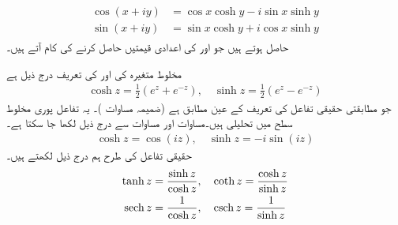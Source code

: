 \begin{gather}
\begin{aligned}\label{مساوات_مخلوط_ہذلولی_تعریف_خ}
\cos(x+iy)&=\cos x\cosh y-i\sin x\sinh y\\
\sin(x+iy)&=\sin x\cosh y+i\cos x\sinh y
\end{aligned}
\end{gather}
حاصل ہوتے ہیں جو  اور  کی اعدادی قیمتیں حاصل کرنے کی کام آتے ہیں۔

مخلوط متغیرہ  کی  اور  کی تعریف درج ذیل ہے
\begin{align}\label{مساوات_مخلوط_ہذلولی_تعریف_ل}
\cosh z=\frac{1}{2}(e^z+e^{-z}),\quad \sinh z=\frac{1}{2}(e^z-e^{-z})
\end{align}
جو مطابقتی حقیقی تفاعل کی تعریف کے عین مطابق ہے (ضمیمہ  مساوات )۔ یہ تفاعل پوری مخلوط سطح میں تحلیلی ہیں۔مساوات  اور مساوات  سے درج ذیل لکھا جا سکتا ہے۔
\begin{align}\label{مساوات_مخلوط_ہذلولی_تعریف_م}
\cosh z=\cos (iz),\quad \sinh z=-i\sin (iz)
\end{align}
حقیقی تفاعل کی طرح ہم درج ذیل لکھتے ہیں۔
\begin{gather}
\begin{aligned}\label{مساوات_مخلوط_ہذلولی_تعریف_ن}
\tanh z &=\frac{\sinh z}{\cosh z},\quad \coth z=\frac{\cosh z}{\sinh z}\\
\operatorname{sech} z&=\frac{1}{\cosh z},\quad \operatorname{csch} z=\frac{1}{\sinh z}
\end{aligned}
\end{gather}

